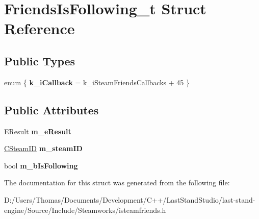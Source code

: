 \hypertarget{structFriendsIsFollowing__t}{}\section{Friends\+Is\+Following\+\_\+t Struct Reference}
\label{structFriendsIsFollowing__t}
\subsection*{Public Types}
\begin{DoxyCompactItemize}
\item 
\hypertarget{structFriendsIsFollowing__t_ab4ec492b7013f4c294977b7546dcc61c}{}enum \{ {\bfseries k\+\_\+i\+Callback} = k\+\_\+i\+Steam\+Friends\+Callbacks + 45
 \}\label{structFriendsIsFollowing__t_ab4ec492b7013f4c294977b7546dcc61c}

\end{DoxyCompactItemize}
\subsection*{Public Attributes}
\begin{DoxyCompactItemize}
\item 
\hypertarget{structFriendsIsFollowing__t_a3b16099ca5e8413bc06e75ba7ca2d661}{}E\+Result {\bfseries m\+\_\+e\+Result}\label{structFriendsIsFollowing__t_a3b16099ca5e8413bc06e75ba7ca2d661}

\item 
\hypertarget{structFriendsIsFollowing__t_a47bc07cbc639db1baa21226abfcf5f43}{}\hyperlink{classCSteamID}{C\+Steam\+I\+D} {\bfseries m\+\_\+steam\+I\+D}\label{structFriendsIsFollowing__t_a47bc07cbc639db1baa21226abfcf5f43}

\item 
\hypertarget{structFriendsIsFollowing__t_a2659bb60c6ccb761653f16401f5281f5}{}bool {\bfseries m\+\_\+b\+Is\+Following}\label{structFriendsIsFollowing__t_a2659bb60c6ccb761653f16401f5281f5}

\end{DoxyCompactItemize}


The documentation for this struct was generated from the following file\+:\begin{DoxyCompactItemize}
\item 
D\+:/\+Users/\+Thomas/\+Documents/\+Development/\+C++/\+Last\+Stand\+Studio/last-\/stand-\/engine/\+Source/\+Include/\+Steamworks/isteamfriends.\+h\end{DoxyCompactItemize}
